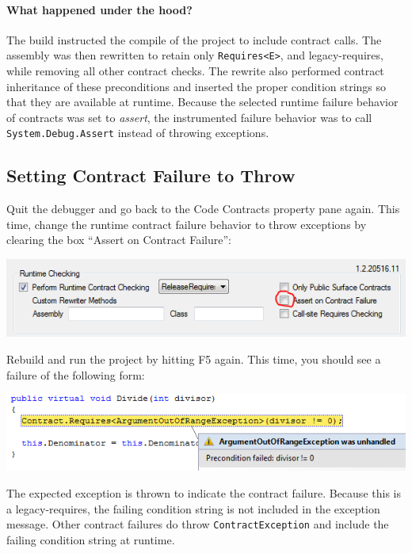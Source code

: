 \documentclass{article}
\newcommand{\code}[1]{\lstinline{#1}}
\begin{document}
\paragraph{What happened under the hood?} The build instructed the compile
of the project to include contract calls.
The assembly was then rewritten to retain only \code{Requires<E>}, and
legacy-requires, while removing all other contract checks. The rewrite
also performed contract inheritance of these preconditions
and inserted the proper condition strings so that they are available
at runtime. Because the selected runtime failure behavior of contracts
was set to \emph{assert}, the instrumented failure behavior was to
call \code{System.Debug.Assert} instead of throwing exceptions. 

\subsection{Setting Contract Failure to Throw}
Quit the debugger and go back to the \textsf{Code Contracts} property
pane again. This time, change the runtime contract failure behavior to
throw exceptions by clearing the box ``Assert on Contract Failure'':
\begin{center}
  \includegraphics[width=.8\columnwidth]{ex6.png}
\end{center}
Rebuild and run the project by hitting F5 again. This time, you should
see a failure of the following form:
\begin{center}
  \includegraphics[width=.8\columnwidth]{ex7.png}
\end{center}
The expected exception is thrown to indicate the contract
failure. Because this is a legacy-requires, the failing condition
string is not included in the exception message. 
Other contract failures do throw \code{ContractException} and include
the failing condition string at runtime.
\end{document}
